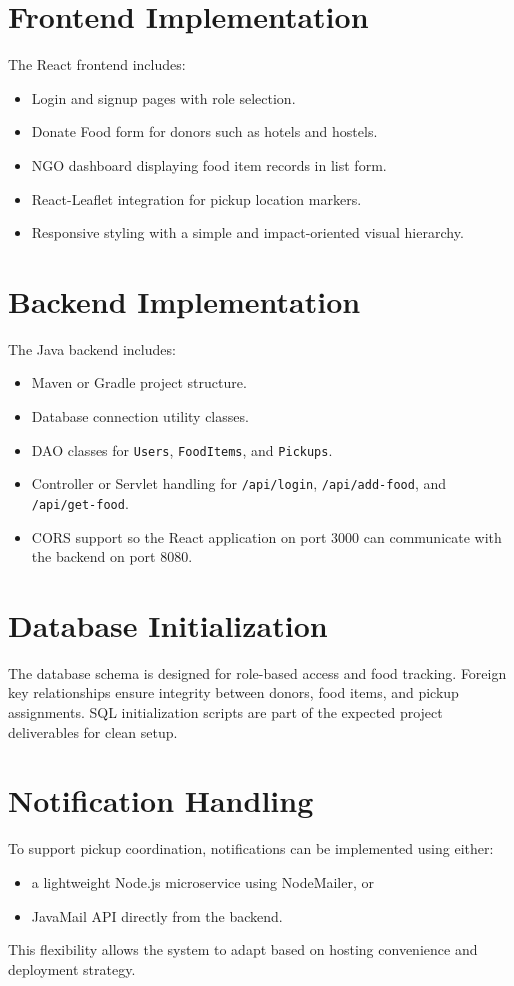 \documentclass[12pt,a4paper]{report}
\begin{document}
\section{Frontend Implementation}
The React frontend includes:
\begin{itemize}[leftmargin=1.2cm]
\item Login and signup pages with role selection.
\item Donate Food form for donors such as hotels and hostels.
\item NGO dashboard displaying food item records in list form.
\item React-Leaflet integration for pickup location markers.
\item Responsive styling with a simple and impact-oriented visual hierarchy.
\end{itemize}

\section{Backend Implementation}
The Java backend includes:
\begin{itemize}[leftmargin=1.2cm]
\item Maven or Gradle project structure.
\item Database connection utility classes.
\item DAO classes for \texttt{Users}, \texttt{FoodItems}, and \texttt{Pickups}.
\item Controller or Servlet handling for \texttt{/api/login}, \texttt{/api/add-food}, and \texttt{/api/get-food}.
\item CORS support so the React application on port 3000 can communicate with the backend on port 8080.
\end{itemize}

\section{Database Initialization}
The database schema is designed for role-based access and food tracking. Foreign key relationships ensure integrity between donors, food items, and pickup assignments. SQL initialization scripts are part of the expected project deliverables for clean setup.

\section{Notification Handling}
To support pickup coordination, notifications can be implemented using either:
\begin{itemize}[leftmargin=1.2cm]
\item a lightweight Node.js microservice using NodeMailer, or
\item JavaMail API directly from the backend.
\end{itemize}
This flexibility allows the system to adapt based on hosting convenience and deployment strategy.
\end{document}
